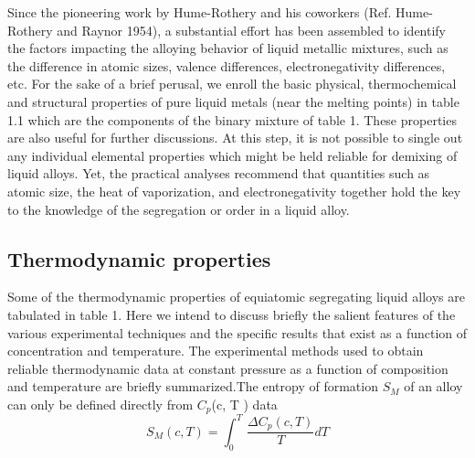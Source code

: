 \documentclass[12pt]{article}
\newcommand*{\1}{\hspace{1pt}}
\begin{document}
        Since the pioneering work by Hume-Rothery and his coworkers (Ref.\cite{s4} Hume-
    Rothery and Raynor 1954), a substantial effort has been assembled to identify the factors
    impacting the alloying behavior of liquid metallic mixtures, such as the difference in atomic
    sizes, valence differences, electronegativity differences, etc. For the sake of a brief perusal, 
    we enroll the basic physical, thermochemical and structural properties of pure liquid metals
    (near the melting points) in table 1.1 which are the components of the binary mixture of
    table 1. These properties are also useful for further discussions. At this step, it is not
    possible to single out any individual elemental properties which might be held reliable
    for demixing of liquid alloys. Yet, the practical analyses recommend
    that quantities such as atomic size, the heat of vaporization, and electronegativity together hold
    the key to the knowledge  of the segregation or order in a liquid alloy.


    \subsection{ Thermodynamic properties }


        Some of the thermodynamic properties of equiatomic segregating liquid alloys are tabulated
    in table 1. Here we intend to discuss briefly the salient features of the various experimental
    techniques and the specific results that exist as a function of concentration and temperature.
    The experimental methods used to obtain reliable thermodynamic data at constant pressure
    as a function of composition and temperature are briefly summarized.The entropy of formation $S _M$ 
    of an alloy can only be defined directly from $C _p$(c, T ) data 
        \begin{equation}
            S _M(c,T) = \int_{0}^{T}  \,\frac{\Delta {C _p(c,T)}}{T} dT 
        \end{equation}                    
        \\
        \\
\end{document}
